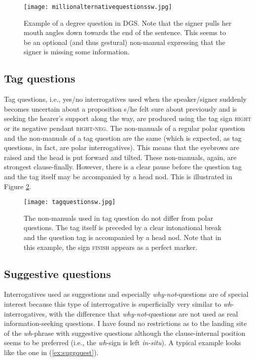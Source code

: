 \begin{figure}[bt]
\centering
	\texttt{[image: millionalternativequestionssw.jpg]}
	\caption{Example of a degree question in DGS. Note that the signer pulls her mouth angles down towards the end of the sentence. This seems to be an optional (and thus gestural) non-manual expressing that the signer is missing some information.  }
	\label{millionalternativequestions}
\end{figure}


\subsection{Tag questions}
Tag questions, i.e., yes/no interrogatives used when the speaker/signer suddenly becomes uncertain about a proposition s/he felt sure about previously and is seeking the hearer's support along the way, are produced using the tag sign \textsc{right} or its negative pendant \textsc{right-neg}. The non-manuals of a regular polar question and the non-manuals of a tag question are the same (which is expected, as tag questions, in fact, are polar interrogatives). This means that the eyebrows are raised and the head is put forward and tilted. These non-manuals, again, are strongest clause-finally. However, there is a clear pause before the question tag and the tag itself may be accompanied by a head nod. This is illustrated in Figure \ref{tagquestion}.

\begin{figure}[bt]
\centering
	\texttt{[image: tagquestionsw.jpg]}
	\caption{The non-manuals used in tag question do not differ from polar questions. The tag itself is preceded by a clear intonational break and the question tag is accompanied by a head nod. Note that in this example, the sign \textsc{finish} appears as a perfect marker.}
	\label{tagquestion}
\end{figure}



\subsection{Suggestive questions}
Interrogatives used as suggestions and especially \textit{why-not}-questions are of special interest because this type of interrogative is superficially very similar to \textit{wh}-interrogatives, with the difference that \textit{why-not}-questions are not used as real information-seeking questions. I have found no restrictions as to the landing site of the \textit{wh}-phrase with suggestive questions although the clause-internal position seems to be preferred (i.e., the \textit{wh}-sign is left \textit{in-situ}). A typical example looks like the one in (\ref{ex:suggquest}).

